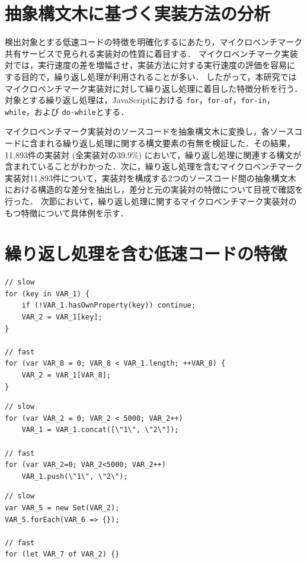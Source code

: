 \documentclass[11pt]{jreport}
\begin{document}
\section{抽象構文木に基づく実装方法の分析}

検出対象とする低速コードの特徴を明確化するにあたり，マイクロベンチマーク共有サービスで見られる実装対の性質に着目する．
マイクロベンチマーク実装対では，実行速度の差を増幅させ，実装方法に対する実行速度の評価を容易にする目的で，繰り返し処理が利用されることが多い．
したがって，本研究ではマイクロベンチマーク実装対に対して繰り返し処理に着目した特徴分析を行う．
対象とする繰り返し処理は，JavaScriptにおける \texttt{for}，\texttt{for-of}，\texttt{for-in}，\texttt{while}，および \texttt{do-while}とする．

マイクロベンチマーク実装対のソースコードを抽象構文木に変換し，各ソースコードに含まれる繰り返し処理に関する構文要素の有無を検証した．その結果，11,893件の実装対 (全実装対の39.9\%) において，繰り返し処理に関連する構文が含まれていることがわかった．次に，繰り返し処理を含むマイクロベンチマーク実装対11,893件について，実装対を構成する2つのソースコード間の抽象構文木における構造的な差分を抽出し，差分と元の実装対の特徴について目視で確認を行った．
次節において，繰り返し処理に関するマイクロベンチマーク実装対のもつ特徴について具体例を示す．


\section{繰り返し処理を含む低速コードの特徴}

\begin{lstlisting}[caption=繰り返し処理自体の実装方法が異なる実装対, label=diff-loop, captionpos=t, columns=flexible]
// slow
for (key in VAR_1) {
    if (!VAR_1.hasOwnProperty(key)) continue;
    VAR_2 = VAR_1[key];
}

// fast
for (var VAR_8 = 0; VAR_8 < VAR_1.length; ++VAR_8) {
    VAR_2 = VAR_1[VAR_8];
}
\end{lstlisting}
\begin{lstlisting}[caption=繰り返し内部で実行する処理の記述方法が異なる実装対, label=diff-inloop, captionpos=t, columns=flexible]
// slow
for (var VAR_2 = 0; VAR_2 < 5000; VAR_2++)
    VAR_1 = VAR_1.concat([\"1\", \"2\"]);

// fast
for (var VAR_2=0; VAR_2<5000; VAR_2++)
    VAR_1.push(\"1\", \"2\");
\end{lstlisting}
\begin{lstlisting}[caption=メソッド処理と代替する繰り返し処理に関する実装対, label=diff-method, captionpos=t, columns=flexible]
// slow
var VAR_5 = new Set(VAR_2);
VAR_5.forEach(VAR_6 => {});

// fast
for (let VAR_7 of VAR_2) {}
\end{lstlisting}
\end{document}
